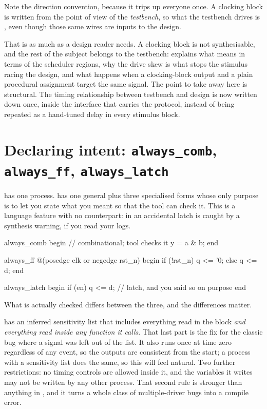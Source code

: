 Note the direction convention, because it trips up everyone once. A clocking
block is written from the point of view of the \emph{testbench}, so what the
testbench drives is , even though those same wires are inputs to
the design.

That is as much as a design reader needs. A clocking block is not
synthesisable, and the rest of the subject belongs to the testbench:
 explains what  means in terms of the scheduler
regions, why the drive skew is what stops the stimulus racing the design, and
what happens when a clocking-block output and a plain procedural assignment
target the same signal. The point to take away here is structural. The timing
relationship between testbench and design is now written down once, inside the
interface that carries the protocol, instead of being repeated as a hand-tuned
delay in every stimulus block.

\section{Declaring intent: \texttt{always\_comb}, \texttt{always\_ff}, \texttt{always\_latch}}
\label{sec:beyond:always}

\VHDL{} has one process. \SV{} has one general  plus three
specialised forms whose only purpose is to let you state what you meant so
that the tool can check it. This is a language feature with no \VHDL{}
counterpart: in \VHDL{} an accidental latch is caught by a synthesis warning,
if you read your logs.

\begin{svcode}
always_comb begin              // combinational; tool checks it
  y = a & b;
end

always_ff @(posedge clk or negedge rst_n) begin
  if (!rst_n) q <= '0;
  else        q <= d;
end

always_latch begin
  if (en) q <= d;              // latch, and you said so on purpose
end
\end{svcode}

What is actually checked differs between the three, and the differences
matter.

 has an inferred sensitivity list that includes everything
read in the block \emph{and everything read inside any function it calls}.
That last part is the fix for the classic  bug where a
signal was left out of the list. It also runs once at time zero regardless of
any event, so the outputs are consistent from the start; a \VHDL{} process
with a sensitivity list does the same, so this will feel natural. Two further
restrictions: no timing controls are allowed inside it, and the variables it
writes may not be written by any other process. That second rule is stronger
than anything in \VHDL{}, and it turns a whole class of multiple-driver bugs
into a compile error.

